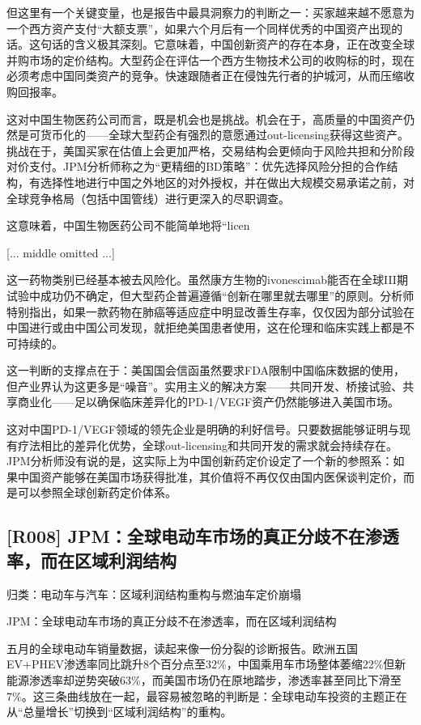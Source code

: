 \documentclass[11pt]{ctexart}
\begin{document}
但这里有一个关键变量，也是报告中最具洞察力的判断之一：买家越来越不愿意为一个西方资产支付“大额支票”，如果六个月后有一个同样优秀的中国资产出现的话。这句话的含义极其深刻。它意味着，中国创新资产的存在本身，正在改变全球并购市场的定价结构。大型药企在评估一个西方生物技术公司的收购标的时，现在必须考虑中国同类资产的竞争。快速跟随者正在侵蚀先行者的护城河，从而压缩收购回报率。

这对中国生物医药公司而言，既是机会也是挑战。机会在于，高质量的中国资产仍然是可货币化的——全球大型药企有强烈的意愿通过out-licensing获得这些资产。挑战在于，美国买家在估值上会更加严格，交易结构会更倾向于风险共担和分阶段对价支付。JPM分析师称之为“更精细的BD策略”：优先选择风险分担的合作结构，有选择性地进行中国之外地区的对外授权，并在做出大规模交易承诺之前，对全球竞争格局（包括中国管线）进行更深入的尽职调查。

这意味着，中国生物医药公司不能简单地将“licen

[... middle omitted ...]

这一药物类别已经基本被去风险化。虽然康方生物的ivonescimab能否在全球III期试验中成功仍不确定，但大型药企普遍遵循“创新在哪里就去哪里”的原则。分析师特别指出，如果一款药物在肺癌等适应症中明显改善生存率，仅仅因为部分试验在中国进行或由中国公司发现，就拒绝美国患者使用，这在伦理和临床实践上都是不可持续的。

这一判断的支撑点在于：美国国会信函虽然要求FDA限制中国临床数据的使用，但产业界认为这更多是“噪音”。实用主义的解决方案——共同开发、桥接试验、共享商业化——足以确保临床差异化的PD-1/VEGF资产仍然能够进入美国市场。

这对中国PD-1/VEGF领域的领先企业是明确的利好信号。只要数据能够证明与现有疗法相比的差异化优势，全球out-licensing和共同开发的需求就会持续存在。JPM分析师没有说的是，这实际上为中国创新药定价设定了一个新的参照系：如果中国资产能够在美国市场获得批准，其价值将不再仅仅由国内医保谈判定价，而是可以参照全球创新药定价体系。

\subsection{[R008] JPM：全球电动车市场的真正分歧不在渗透率，而在区域利润结构}
{\small\color{refgray}归类：电动车与汽车：区域利润结构重构与燃油车定价崩塌}

JPM：全球电动车市场的真正分歧不在渗透率，而在区域利润结构

五月的全球电动车销量数据，读起来像一份分裂的诊断报告。欧洲五国EV+PHEV渗透率同比跳升8个百分点至32\%，中国乘用车市场整体萎缩22\%但新能源渗透率却逆势突破63\%，而美国市场仍在原地踏步，渗透率甚至同比下滑至7\%。这三条曲线放在一起，最容易被忽略的判断是：全球电动车投资的主题正在从“总量增长”切换到“区域利润结构”的重构。
\end{document}

